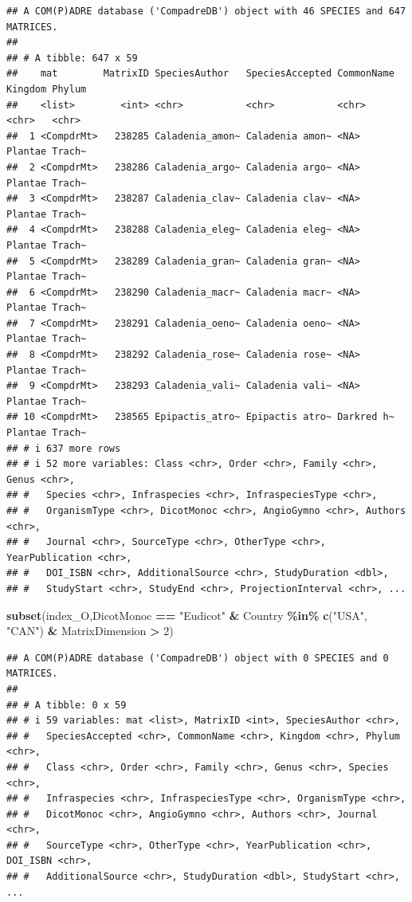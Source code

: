 \documentclass[
]{book}
\newenvironment{Shaded}{\begin{snugshade}}{\end{snugshade}}
\newcommand{\DecValTok}[1]{\textcolor[rgb]{0.00,0.00,0.81}{#1}}
\newcommand{\FunctionTok}[1]{\textcolor[rgb]{0.13,0.29,0.53}{\textbf{#1}}}
\newcommand{\NormalTok}[1]{#1}
\newcommand{\SpecialCharTok}[1]{\textcolor[rgb]{0.81,0.36,0.00}{\textbf{#1}}}
\newcommand{\StringTok}[1]{\textcolor[rgb]{0.31,0.60,0.02}{#1}}
\theoremstyle{definition}
\theoremstyle{definition}
\theoremstyle{definition}
\theoremstyle{definition}
\theoremstyle{remark}
\begin{document}
\begin{verbatim}
## A COM(P)ADRE database ('CompadreDB') object with 46 SPECIES and 647 MATRICES.
## 
## # A tibble: 647 x 59
##    mat        MatrixID SpeciesAuthor   SpeciesAccepted CommonName Kingdom Phylum
##    <list>        <int> <chr>           <chr>           <chr>      <chr>   <chr> 
##  1 <CompdrMt>   238285 Caladenia_amon~ Caladenia amon~ <NA>       Plantae Trach~
##  2 <CompdrMt>   238286 Caladenia_argo~ Caladenia argo~ <NA>       Plantae Trach~
##  3 <CompdrMt>   238287 Caladenia_clav~ Caladenia clav~ <NA>       Plantae Trach~
##  4 <CompdrMt>   238288 Caladenia_eleg~ Caladenia eleg~ <NA>       Plantae Trach~
##  5 <CompdrMt>   238289 Caladenia_gran~ Caladenia gran~ <NA>       Plantae Trach~
##  6 <CompdrMt>   238290 Caladenia_macr~ Caladenia macr~ <NA>       Plantae Trach~
##  7 <CompdrMt>   238291 Caladenia_oeno~ Caladenia oeno~ <NA>       Plantae Trach~
##  8 <CompdrMt>   238292 Caladenia_rose~ Caladenia rose~ <NA>       Plantae Trach~
##  9 <CompdrMt>   238293 Caladenia_vali~ Caladenia vali~ <NA>       Plantae Trach~
## 10 <CompdrMt>   238565 Epipactis_atro~ Epipactis atro~ Darkred h~ Plantae Trach~
## # i 637 more rows
## # i 52 more variables: Class <chr>, Order <chr>, Family <chr>, Genus <chr>,
## #   Species <chr>, Infraspecies <chr>, InfraspeciesType <chr>,
## #   OrganismType <chr>, DicotMonoc <chr>, AngioGymno <chr>, Authors <chr>,
## #   Journal <chr>, SourceType <chr>, OtherType <chr>, YearPublication <chr>,
## #   DOI_ISBN <chr>, AdditionalSource <chr>, StudyDuration <dbl>,
## #   StudyStart <chr>, StudyEnd <chr>, ProjectionInterval <chr>, ...
\end{verbatim}

\begin{Shaded}
\begin{Highlighting}[]
\FunctionTok{subset}\NormalTok{(index\_O,DicotMonoc }\SpecialCharTok{==} \StringTok{"Eudicot"} \SpecialCharTok{\&} 
\NormalTok{              Country }\SpecialCharTok{\%in\%} \FunctionTok{c}\NormalTok{(}\StringTok{"USA"}\NormalTok{, }\StringTok{"CAN"}\NormalTok{) }\SpecialCharTok{\&} 
\NormalTok{              MatrixDimension }\SpecialCharTok{\textgreater{}} \DecValTok{2}\NormalTok{)}
\end{Highlighting}
\end{Shaded}

\begin{verbatim}
## A COM(P)ADRE database ('CompadreDB') object with 0 SPECIES and 0 MATRICES.
## 
## # A tibble: 0 x 59
## # i 59 variables: mat <list>, MatrixID <int>, SpeciesAuthor <chr>,
## #   SpeciesAccepted <chr>, CommonName <chr>, Kingdom <chr>, Phylum <chr>,
## #   Class <chr>, Order <chr>, Family <chr>, Genus <chr>, Species <chr>,
## #   Infraspecies <chr>, InfraspeciesType <chr>, OrganismType <chr>,
## #   DicotMonoc <chr>, AngioGymno <chr>, Authors <chr>, Journal <chr>,
## #   SourceType <chr>, OtherType <chr>, YearPublication <chr>, DOI_ISBN <chr>,
## #   AdditionalSource <chr>, StudyDuration <dbl>, StudyStart <chr>, ...
\end{verbatim}
\end{document}
